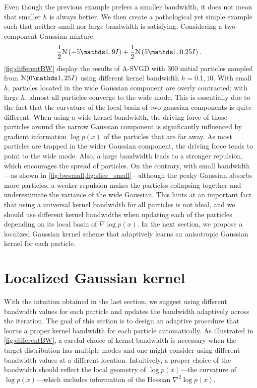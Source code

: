 Even though the previous example prefers a smaller bandwidth, it does not
mean that smaller $h$ is always better. We then create a pathological yet simple example such that
neither small nor large bandwidth is satisfying.
Considering a two-component Gaussian mixture:
\[
\frac{1}{2}\distNorm\left( -5 \ind, 9I \right)  + \frac{1}{2}\distNorm\left( 5\ind, 0.25I \right).
\]
\cref{fig:differentBW} display the results of A-SVGD with $300$ initial
particles sampled from $\distNorm(0\ind, 25I )$ using different kernel
bandwidth $h = 0.1, 10$. With small $h$, particles located in the wide
Gaussian component are overly contracted; with large $h$, almost all
particles converge to the wide mode.
This is essentially due to the fact that the curvature of the local basin of
two gaussian components is quite different. When using a wide kernel
bandwidth, the driving force of those particles around the narrow Gaussian
component is significantly influenced by gradient information $\log p(x)$ of
the particles that are far away. As most particles are trapped in the wider
Gaussian component, the driving force tends to point to the wide mode. Also,
a large bandwidth leads to a stronger repulsion, which encourages the spread
of particles. On the contrary, with small bandwidth---as shown in
\cref{fig:bwsmall,fig:slice_small}---although the peaky Gaussian absorbs more
particles, a weaker repulsion makes the particles collapsing together and 
underestimate the variance of the wide Gaussian.
This hints at an important fact that using a universal kernel bandwidth for
all particles is not ideal, and we should use different kernel bandwidths
when updating each of the particles depending on its local basin of $\nabla
\log p(x)$. In the next section, we propose a localized Gaussian kernel  scheme that adaptively learns an anisotropic Gaussian kernel for each particle.




\section{Localized Gaussian kernel} \label{sec:bw}

With the intuition obtained in the last section, we suggest using different
bandwidth values for each particle and updates the bandwidth adaptively
across the iteration. The goal of this section is to design an adaptive
procedure that learns a proper kernel bandwidth for each particle
automatically. As illustrated in \cref{fig:differentBW}, a careful choice of
kernel bandwidth is necessary when the target distribution has multiple modes
and one might consider using different bandwidth values at a different
location. Intuitively, a proper choice of the bandwidth should reflect the
local geometry of $\log p(x)$---the curvature of $\log p(x)$---which includes
information of the Hessian $\nabla^2 \log p(x)$.

